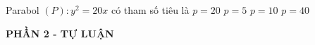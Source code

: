 \begin{ex}%
	Parabol $(P)\colon y^2=20x$ có tham số tiêu là
	\choice
	{$p=20$}
	{$p=5$}
	{\True $p=10$}
	{$p=40$}
\end{ex}




\begin{center}
	\textbf{PHẦN 2 - TỰ LUẬN}
\end{center}

